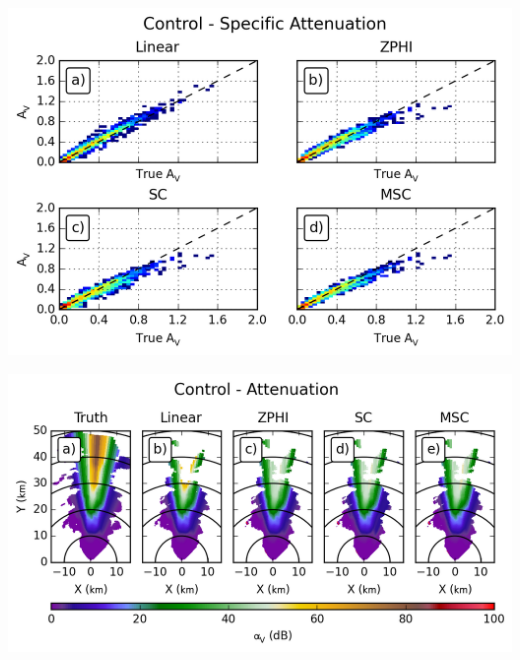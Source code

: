 \documentclass[red]{beamer}
\begin{document}
\begin{frame}
    \begin{center}
        \includegraphics[scale=0.7]{figures/spatial/C_Control_Specific_Attenuation_V_scatter}
    \end{center}
\end{frame}

\begin{frame}
    \begin{center}
        \includegraphics[scale=0.7]{figures/spatial/X_Control_Attenuation_V}
    \end{center}
\end{frame}
\end{document}
